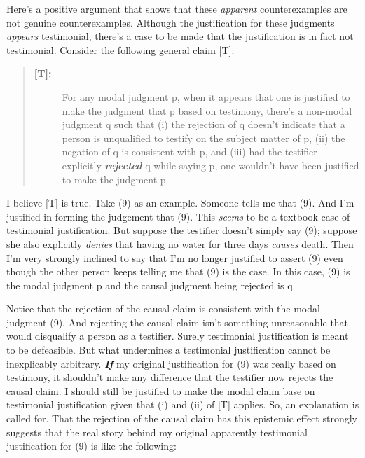 \documentclass[a4paper,12pt]{article}
\begin{document}
Here's a positive argument that shows that these \emph{apparent} counterexamples are not genuine counterexamples. Although the justification for these judgments \emph{appears} testimonial, there's a case to be made that the justification is in fact not testimonial. Consider the following general claim [T]:

\begin{quote}
\begin{description}
\item[\textbf{[T]:}] For any modal judgment p, when it appears that one is justified to make the judgment that p based on testimony, there's a non-modal judgment q such that (i) the rejection of q doesn't indicate that a person is unqualified to testify on the subject matter of p, (ii) the negation of q is consistent with p, and (iii) had the testifier explicitly \emph{\textbf{rejected}} q while saying p, one wouldn't have been justified to make the judgment p.
\end{description}
\end{quote}

I believe [T] is true. Take (9) as an example. Someone tells me that (9). And I'm justified in forming the judgement that (9). This \emph{seems} to be a textbook case of testimonial justification. But suppose the testifier doesn't simply say (9); suppose she also explicitly \emph{denies} that having no water for three days \emph{causes} death. Then I'm very strongly inclined to say that I'm no longer justified to assert (9) even though the other person keeps telling me that (9) is the case. In this case, (9) is the modal judgment p and the causal judgment being rejected is q.

Notice that the rejection of the causal claim is consistent with the modal judgment (9). And rejecting the causal claim isn't something unreasonable that would disqualify a person as a testifier. Surely testimonial justification is meant to be defeasible. But what undermines a testimonial justification cannot be inexplicably arbitrary. \emph{\textbf{If}} my original justification for (9) was really based on testimony, it shouldn't make any difference that the testifier now rejects the causal claim. I should still be justified to make the modal claim base on testimonial justification given that (i) and (ii) of [T] applies. So, an explanation is called for. That the rejection of the causal claim has this epistemic effect strongly suggests that the real story behind my original apparently testimonial justification for (9) is like the following:
\end{document}
